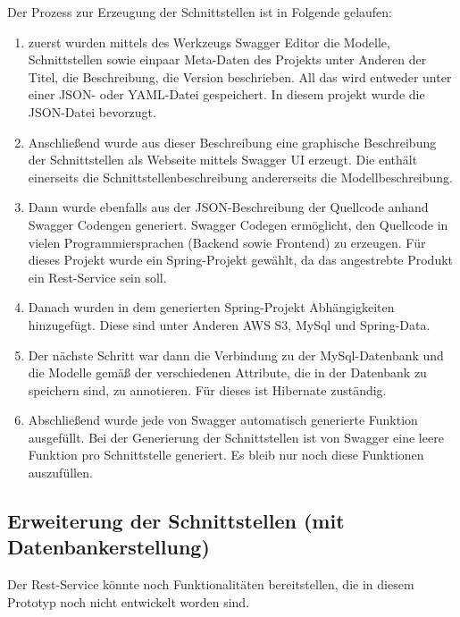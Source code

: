 \documentclass[a4paper,twoside]{article}
\begin{document}
	Der Prozess zur Erzeugung der Schnittstellen ist in Folgende gelaufen:
	\begin{enumerate}
		\item zuerst wurden mittels des Werkzeugs Swagger Editor die Modelle, Schnittstellen sowie einpaar Meta-Daten des Projekts unter Anderen der Titel, die Beschreibung, die Version beschrieben. All das wird entweder unter einer JSON- oder YAML-Datei gespeichert. In diesem projekt wurde die JSON-Datei bevorzugt.
		
		\item Anschlie\ss{}end wurde aus dieser Beschreibung eine graphische Beschreibung der Schnittstellen als Webseite mittels Swagger UI erzeugt. Die enth\"alt einerseits die Schnittstellenbeschreibung andererseits die Modellbeschreibung.
		
		\item Dann wurde ebenfalls aus der JSON-Beschreibung der Quellcode anhand Swagger Codengen generiert. Swagger Codegen erm\"oglicht, den Quellcode in vielen Programmiersprachen (Backend sowie Frontend) zu erzeugen. F\"ur dieses Projekt wurde ein Spring-Projekt gew\"ahlt, da das angestrebte Produkt ein Rest-Service sein soll.
		
		\item Danach wurden in dem generierten Spring-Projekt Abh\"angigkeiten hinzugef\"ugt. Diese sind unter Anderen AWS S3, MySql und Spring-Data.
		
		\item Der n\"achste Schritt war dann die Verbindung zu der MySql-Datenbank und die Modelle gem\"a\ss{} der verschiedenen Attribute, die in der Datenbank zu speichern sind, zu annotieren. F\"ur dieses ist Hibernate zust\"andig.
		
		\item Abschlie\ss{}end wurde jede von Swagger automatisch generierte Funktion ausgef\"ullt. Bei der Generierung der Schnittstellen ist von Swagger eine leere Funktion pro Schnittstelle generiert. Es bleib nur noch diese Funktionen auszuf\"ullen.
	\end{enumerate}
	
	\subsection{Erweiterung der Schnittstellen (mit Datenbankerstellung)}
		
		Der Rest-Service k\"onnte noch Funktionalit\"aten bereitstellen, die in diesem Prototyp noch nicht entwickelt worden sind.
		
\end{document}
